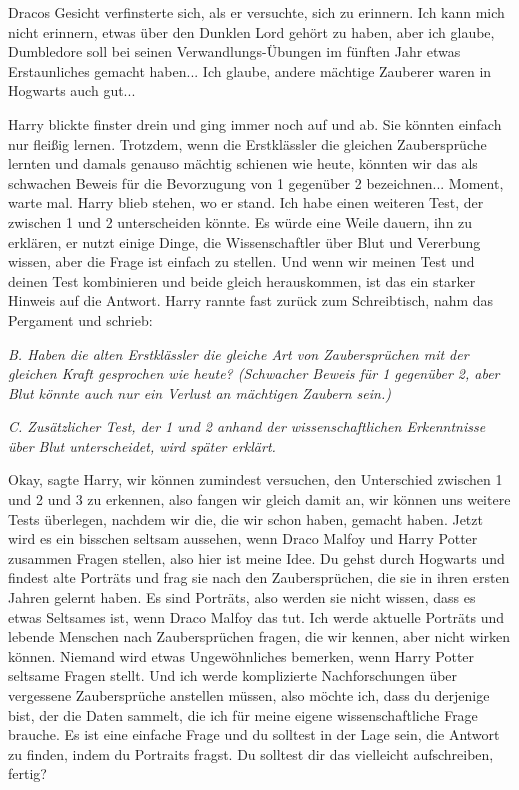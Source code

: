 Dracos Gesicht verfinsterte sich, als er versuchte, sich zu erinnern. \glqq Ich
kann mich nicht erinnern, etwas über den Dunklen Lord gehört zu haben, aber ich
glaube, Dumbledore soll bei seinen Verwandlungs-Übungen im fünften Jahr etwas
Erstaunliches gemacht haben... Ich glaube, andere mächtige Zauberer waren in
Hogwarts auch gut...\grqq{}

Harry blickte finster drein und ging immer noch auf und ab. \glqq Sie könnten
einfach nur fleißig lernen. Trotzdem, wenn die Erstklässler die gleichen
Zaubersprüche lernten und damals genauso mächtig schienen wie heute, könnten wir
das als schwachen Beweis für die Bevorzugung von 1 gegenüber 2 bezeichnen...
Moment, warte mal.\grqq{} Harry blieb stehen, wo er stand. \glqq Ich habe einen
weiteren Test, der zwischen 1 und 2 unterscheiden könnte. Es würde eine Weile
dauern, ihn zu erklären, er nutzt einige Dinge, die Wissenschaftler über Blut
und Vererbung wissen, aber die Frage ist einfach zu stellen. Und wenn wir meinen
Test und deinen Test kombinieren und beide gleich herauskommen, ist das ein
starker Hinweis auf die Antwort.\grqq{} Harry rannte fast zurück zum
Schreibtisch, nahm das Pergament und schrieb:

\emph{B. Haben die alten Erstklässler die gleiche Art von Zaubersprüchen mit der
gleichen Kraft gesprochen wie heute? (Schwacher Beweis für 1 gegenüber 2, aber
Blut könnte auch nur ein Verlust an mächtigen Zaubern sein.) }

\emph{C. Zusätzlicher Test, der 1 und 2 anhand der wissenschaftlichen
Erkenntnisse über Blut unterscheidet, wird später erklärt. }

\glqq Okay\grqq{}, sagte Harry, \glqq wir können zumindest versuchen, den
Unterschied zwischen 1 und 2 und 3 zu erkennen, also fangen wir gleich damit an,
wir können uns weitere Tests überlegen, nachdem wir die, die wir schon haben,
gemacht haben. Jetzt wird es ein bisschen seltsam aussehen, wenn Draco Malfoy
und Harry Potter zusammen Fragen stellen, also hier ist meine Idee. Du gehst
durch Hogwarts und findest alte Porträts und frag sie nach den Zaubersprüchen,
die sie in ihren ersten Jahren gelernt haben. Es sind Porträts, also werden sie
nicht wissen, dass es etwas Seltsames ist, wenn Draco Malfoy das tut. Ich werde
aktuelle Porträts und lebende Menschen nach Zaubersprüchen fragen, die wir
kennen, aber nicht wirken können. Niemand wird etwas Ungewöhnliches bemerken,
wenn Harry Potter seltsame Fragen stellt. Und ich werde komplizierte
Nachforschungen über vergessene Zaubersprüche anstellen müssen, also möchte ich,
dass du derjenige bist, der die Daten sammelt, die ich für meine eigene
wissenschaftliche Frage brauche. Es ist eine einfache Frage und du solltest in
der Lage sein, die Antwort zu finden, indem du Portraits fragst. Du solltest dir
das vielleicht aufschreiben, fertig?\grqq{}

